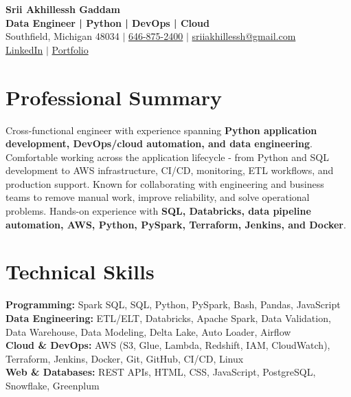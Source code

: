 \documentclass[letterpaper,10pt]{article}
\begin{document}
\fontsize{9.35pt}{10.45pt}\selectfont

\begin{center}
    {\LARGE \textbf{Srii Akhillessh Gaddam}} \\[-1pt]
    \textbf{Data Engineer | Python | DevOps | Cloud} \\[2pt]
    Southfield, Michigan 48034 $|$
    \href{tel:6468752400}{646-875-2400} $|$
    \href{mailto:sriiakhillessh@gmail.com}{sriiakhillessh@gmail.com} \\[1pt]
    \href{https://www.linkedin.com/in/srii-akhiilessh-gaddam-b48668191/}{LinkedIn} $|$
    \href{https://sriiakhillesshg.github.io/portfolio/}{Portfolio}
\end{center}
\vspace{-8pt}

\section{Professional Summary}
\small{Cross-functional engineer with experience spanning \textbf{Python application development, DevOps/cloud automation, and data engineering}. Comfortable working across the application lifecycle - from Python and SQL development to AWS infrastructure, CI/CD, monitoring, ETL workflows, and production support. Known for collaborating with engineering and business teams to remove manual work, improve reliability, and solve operational problems. Hands-on experience with \textbf{SQL, Databricks, data pipeline automation, AWS, Python, PySpark, Terraform, Jenkins, and Docker}.}

\section{Technical Skills}
\small{
\textbf{Programming:} Spark SQL, SQL, Python, PySpark, Bash, Pandas, JavaScript \\
\textbf{Data Engineering:} ETL/ELT, Databricks, Apache Spark, Data Validation, Data Warehouse, Data Modeling, Delta Lake, Auto Loader, Airflow \\
\textbf{Cloud \& DevOps:} AWS (S3, Glue, Lambda, Redshift, IAM, CloudWatch), Terraform, Jenkins, Docker, Git, GitHub, CI/CD, Linux \\
\textbf{Web \& Databases:} REST APIs, HTML, CSS, JavaScript, PostgreSQL, Snowflake, Greenplum
}
\end{document}
